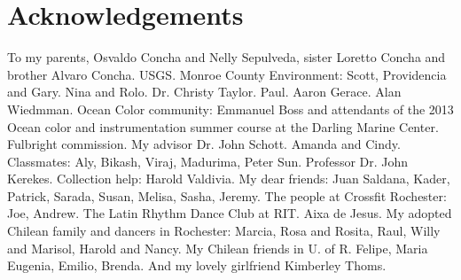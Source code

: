\documentclass{book}
\let\stdsection\chapter
\renewcommand\chapter{\newpage\stdsection}
\begin{document}
\chapter*{Acknowledgements}
\begin{acknowledgements}
\setlength{\parindent}{20pt}
To my parents, Osvaldo Concha and Nelly Sepulveda, sister Loretto Concha and brother Alvaro Concha. USGS. Monroe County Environment: Scott, Providencia and Gary. Nina and Rolo. Dr. Christy Taylor. Paul. Aaron Gerace. Alan Wiedmman. Ocean Color community: Emmanuel Boss and attendants of the 2013 Ocean color and instrumentation summer course at the Darling Marine Center. Fulbright commission. My advisor Dr. John Schott. Amanda and Cindy. Classmates: Aly, Bikash, Viraj, Madurima, Peter Sun. Professor Dr. John Kerekes. Collection help: Harold Valdivia. My dear friends: Juan Saldana, Kader, Patrick, Sarada, Susan, Melisa, Sasha, Jeremy. The people at Crossfit Rochester: Joe, Andrew. The Latin Rhythm Dance Club at RIT. Aixa de Jesus. My adopted Chilean family and dancers in Rochester: Marcia, Rosa and Rosita, Raul, Willy and Marisol, Harold and Nancy. My Chilean friends in U. of R. Felipe, Maria Eugenia, Emilio, Brenda. And my lovely girlfriend Kimberley Thoms.
\end{acknowledgements}

\tableofcontents

\listoffigures
{}

\listoftables
{}

% 








\listoftodos

%
%




\printindex
\end{document}
